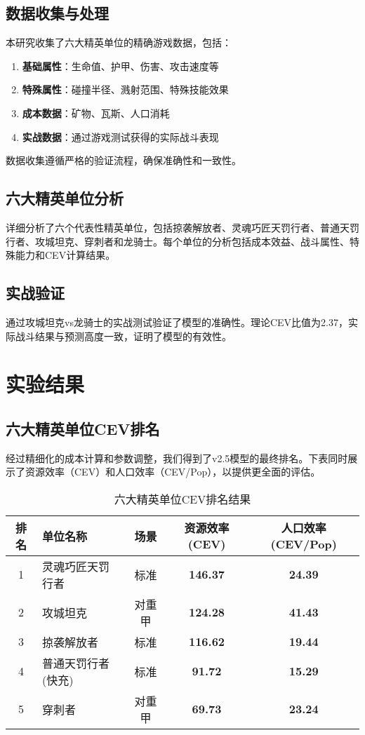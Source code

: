 \documentclass[a4paper,12pt]{article}
\begin{document}
\subsection{数据收集与处理}

本研究收集了六大精英单位的精确游戏数据，包括：

\begin{enumerate}
    \item \textbf{基础属性}：生命值、护甲、伤害、攻击速度等
    \item \textbf{特殊属性}：碰撞半径、溅射范围、特殊技能效果
    \item \textbf{成本数据}：矿物、瓦斯、人口消耗
    \item \textbf{实战数据}：通过游戏测试获得的实际战斗表现
\end{enumerate}

数据收集遵循严格的验证流程，确保准确性和一致性。

\subsection{六大精英单位分析}

详细分析了六个代表性精英单位，包括掠袭解放者、灵魂巧匠天罚行者、普通天罚行者、攻城坦克、穿刺者和龙骑士。每个单位的分析包括成本效益、战斗属性、特殊能力和CEV计算结果。

\subsection{实战验证}

通过攻城坦克vs龙骑士的实战测试验证了模型的准确性。理论CEV比值为2.37，实际战斗结果与预测高度一致，证明了模型的有效性。

\section{实验结果}

\subsection{六大精英单位CEV排名}

经过精细化的成本计算和参数调整，我们得到了v2.5模型的最终排名。下表同时展示了资源效率（CEV）和人口效率（CEV/Pop），以提供更全面的评估。

\begin{table}[htbp]
\centering
\caption{六大精英单位CEV排名结果}
\begin{tabular}{@{}clccc@{}}
\toprule
排名 & 单位名称 & 场景 & 资源效率(CEV) & 人口效率(CEV/Pop) \\
\midrule
1 & 灵魂巧匠天罚行者 & 标准 & \textbf{146.37} & \textbf{24.39} \\
2 & 攻城坦克 & 对重甲 & \textbf{124.28} & \textbf{41.43} \\
3 & 掠袭解放者 & 标准 & \textbf{116.62} & \textbf{19.44} \\
4 & 普通天罚行者(快充) & 标准 & \textbf{91.72} & \textbf{15.29} \\
5 & 穿刺者 & 对重甲 & \textbf{69.73} & \textbf{23.24} \\
\bottomrule
\end{tabular}
\end{table}
\end{document}
